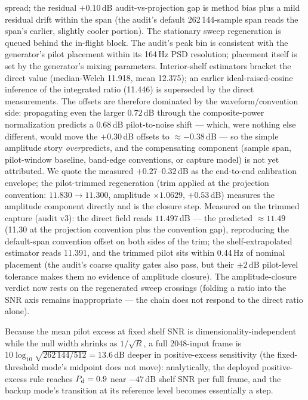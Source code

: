 spread; the residual $+0.10$\,dB audit-vs-projection gap is method
bias plus a mild residual drift within the span (the audit's default
262\,144-sample span reads the span's earlier, slightly cooler
portion). The stationary sweep regeneration is queued behind the
in-flight block. The audit's peak bin is
consistent with the generator's pilot placement within its 164\,Hz PSD
resolution; placement itself is set by the generator's mixing
parameters. Interior-shelf estimators bracket
the direct value (median-Welch 11.918, mean 12.375); an earlier
ideal-raised-cosine inference of the integrated ratio (11.446) is
superseded by the direct measurements. The offsets are therefore
dominated by the waveform/convention side: propagating even the larger
$0.72$\,dB through the composite-power normalization predicts a
$0.68$\,dB pilot-to-noise shift --- which, were nothing else different,
would move the $+0.30$\,dB offsets to $\approx -0.38$\,dB --- so the
simple amplitude story \emph{over}predicts, and the compensating
component (sample span, pilot-window baseline, band-edge conventions,
or capture model) is not yet attributed. We quote the measured
$+0.27$--$0.32$\,dB as the end-to-end calibration envelope; the
pilot-trimmed regeneration (trim applied at the projection convention:
$11.830 \rightarrow 11.300$, amplitude $\times 1.0629$, $+0.53$\,dB)
measures the amplitude component directly and is the closure step.
Measured on the trimmed capture (audit v3): the direct field reads
$11.497$\,dB --- the predicted $\approx 11.49$ (11.30 at the projection
convention plus the convention gap), reproducing the
default-span convention offset on both sides of the trim; the
shelf-extrapolated estimator reads 11.391, and the trimmed pilot sits
within 0.44\,Hz of nominal placement (the audit's coarse quality gates
also pass, but their $\pm 2$\,dB pilot-level tolerance makes them no
evidence of amplitude closure). The amplitude-closure verdict now rests on the regenerated
sweep crossings (folding a ratio into the SNR axis remains
inappropriate --- the chain does not respond to the direct ratio
alone).

Because the mean pilot excess at fixed shelf SNR is
dimensionality-independent while the null width shrinks as $1/\sqrt{R}$,
a full 2048-input frame is $10\log_{10}\sqrt{262\,144/512} = 13.6$\,dB
deeper in positive-excess sensitivity (the fixed-threshold mode's
midpoint does not move): analytically, the deployed positive-excess rule
reaches
$P_{\rm d} = 0.9$ near $-47$\,dB shelf SNR per full frame, and the
backup mode's transition at its reference level becomes essentially a
step.

